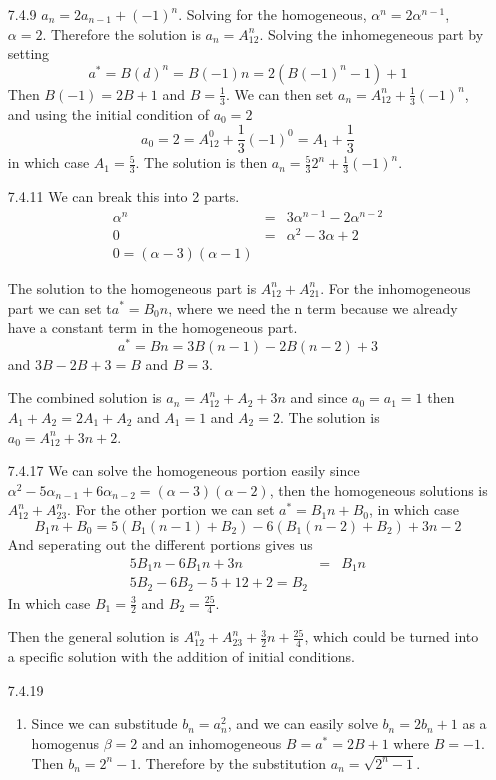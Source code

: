 \documentclass{article}
\begin{document}
\begin{enumerate}
\begin{enumerate}
\end{enumerate}

\item[7.4.9]
$a_n = 2a_{n-1} +(-1) ^ n$. Solving for the homogeneous, $\alpha^n = 2\alpha^{n-1}$, $\alpha = 2$. Therefore the solution is $a_n = A_12^n$. Solving the inhomegeneous part by setting
\[
 a^* = B(d)^n = B(-1)n = 2(B(-1)^n-1) + 1 
\]
Then $B(-1) = 2B + 1$ and $B=\frac{1}{3}$. We can then set $a_n = A_12^n + \frac{1}{3}(-1)^n$, and using the initial condition of $a_0 = 2$ 
\[
a_0 = 2 = A_12^0 + \frac{1}{3}(-1)^0 = A_1+\frac{1}{3}
\]
in which case $A_1 = \frac{5}{3}$. The solution is then $a_n = \frac{5}{3}2^n + \frac{1}{3}(-1)^n$. 
\item[7.4.11]
We can break this into 2 parts. 
\begin{eqnarray}
\alpha^n &=& 3\alpha^{n-1} - 2\alpha^{n-2} \\
0 &=& \alpha^2 - 3\alpha + 2 \\
0 = (\alpha-3)(\alpha-1) 
\end{eqnarray}

The solution to the homogeneous part is $A_12^n+A_21^n$. For the inhomogeneous part we can set t$a^*=B_0n$, where we need the n term because we already have a constant term in the homogeneous part. 
\[
a^* = Bn = 3B(n-1) - 2B(n-2) + 3
\]
and $3B-2B+3=B$ and $B=3$. 

The combined solution is $a_n = A_12^n+A_2+3n$ and since $a_0 = a_1 = 1$ then $A_1+A_2 = 2A_1 +A_2$ and $A_1 = 1$ and $A_2=2$. The solution is $a_0 = A_12^n + 3n + 2$. 

\item[7.4.17]
We can solve the homogeneous portion easily since $\alpha^2-5\alpha_{n-1}+6\alpha_{n-2} = (\alpha-3)(\alpha-2)$, then the homogeneous solutions is $A_12^n+A_23^n$. For the other portion we can set $a^*=B_1n+B_0$, in which case 
\[
B_1n+B_0 = 5(B_1(n-1)+B_2)-6(B_1(n-2) + B_2) + 3n - 2
\] 
And seperating out the different portions gives us
\begin{eqnarray}
5B_1n-6B_1n+3n &=& B_1n \\
5B_2-6B_2-5+12+2 = B_2
\end{eqnarray}
In which case $B_1 = \frac{3}{2}$ and $B_2=\frac{25}{4}$. 

Then the general solution is $A_12^n+A_23^n+\frac{3}{2}n + \frac{25}{4}$, which could be turned into a specific solution with the addition of initial conditions. 

\item[7.4.19]
\begin{enumerate}
\item Since we can substitude $b_n=a^2_n$, and we can easily solve $b_n = 2b_n+1$ as a homogenus $\beta = 2$ and an inhomogeneous $B=a^*=2B+1$ where $B=-1$. Then $b_n = 2^n-1$. Therefore by the substitution $a_n=\sqrt{2^n-1}$. 


\end{enumerate}
\end{enumerate}
\end{document}
